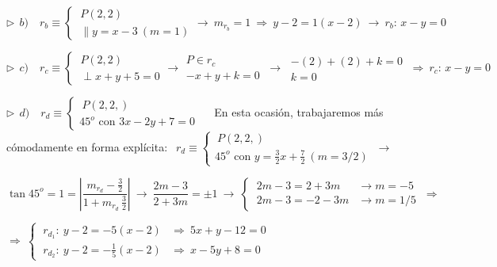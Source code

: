 \begin{miejercicio}
\vspace{5mm} $\triangleright \ \ b)\quad r_b\equiv \begin{cases} \ P(2,2) \\ \ \parallel y=x-3 \ (m=1) \end{cases} \to \ m_{r_b}=1 \ \Rightarrow \ y-2=1(x-2) \ \to \ r_b:\, x-y=0$

\vspace{5mm} $\triangleright \ \ c)\quad  r_c\equiv \begin{cases} \ P(2,2) \\ \ \perp x+y+5=0  \end{cases} \to 
\begin{array}{c}
P\in r_c\\ -x+y+k=0
\end{array} \ \to \ 
\begin{array}{c}
-(2)+(2)+k=0 \\ k=0
\end{array} \ \Rightarrow \ r_c:\, x-y=0$

\vspace{5mm} $\triangleright \ \ d)\quad r_d\equiv \begin{cases} \ P(2,2,) \\ 45^o \text{ con } 3x-2y+7=0 \end{cases} \quad $ En esta ocasión, trabajaremos más cómodamente en forma explícita:
$\ \ r_d\equiv \begin{cases} \ P(2,2,) \\ 45^o \text{ con } y=\frac 3 2 x+\frac 72 \ (m=3/2) \end{cases} \ \to \ $

\vspace{2mm} $ \tan 45^o = 1 = \left| \dfrac{m_{r_d}-\frac 3 2}{1+m_{r_d}\, \frac 3 2}\right| \ \to \  \dfrac{2m-3}{2+3m}=\pm 1 \ \to \ \begin{cases} \ 2m-3=2+3m &\to m=-5 \\ \ 2m-3=-2-3m &\to m=1/5 \end{cases} \ \Rightarrow$

\vspace{2mm} $\Rightarrow \ \begin{cases} \ r_{d_1}:\ y-2=-5(x-2) &\Rightarrow \ 5x+y-12=0 \\ \ r_{d_2}:\ y-2=-\frac 1 5(x-2) &\Rightarrow \ x-5y+8=0 \end{cases}$


\end{miejercicio}	



